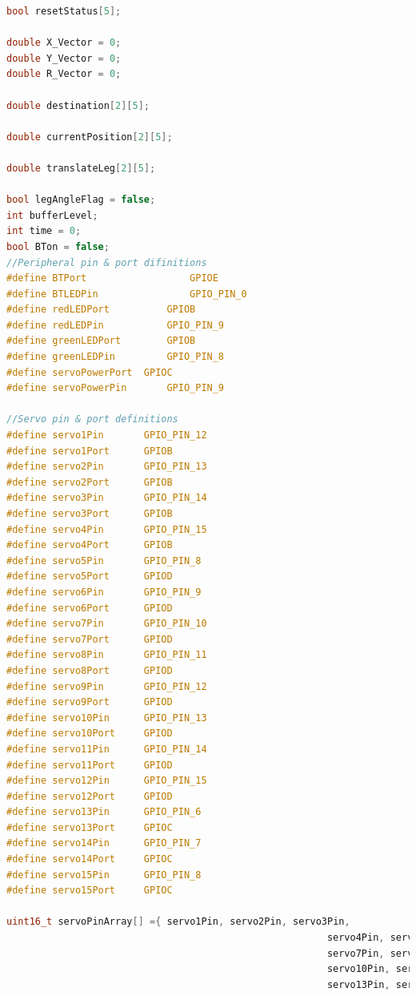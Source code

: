 \begin{lstlisting}[language = c]
bool resetStatus[5];																		//Array used to store reset status of each leg

double X_Vector = 0;																		//Global movement vectors
double Y_Vector = 0;
double R_Vector = 0;	

double destination[2][5];																//2D array that stores X([0]) and Y([1]) values 
																												//for the destination of each foot
double currentPosition[2][5];														//2D array that stores X and Y values for the 
																												//current position of each foot
double translateLeg[2][5];															//Stores coordinates of joint 1 for each leg.
																												//Replaces TranslateLeg()
bool legAngleFlag = false;															//True when busy writing to legAngles
int bufferLevel;																				//Used to select between levels in buffer
int time = 0;																						//Keeps timing of robot movement for speed calculations
bool BTon = false;																			//Used in program to determine if Bluetooth is connected or not.
//Peripheral pin & port difinitions
#define BTPort 					GPIOE
#define BTLEDPin 				GPIO_PIN_0
#define redLEDPort 			GPIOB
#define redLEDPin 			GPIO_PIN_9
#define greenLEDPort 		GPIOB
#define greenLEDPin 		GPIO_PIN_8
#define servoPowerPort	GPIOC
#define servoPowerPin		GPIO_PIN_9

//Servo pin & port definitions
#define servo1Pin 		GPIO_PIN_12
#define servo1Port 		GPIOB
#define servo2Pin 		GPIO_PIN_13
#define servo2Port 		GPIOB
#define servo3Pin 		GPIO_PIN_14
#define servo3Port 		GPIOB
#define servo4Pin 		GPIO_PIN_15
#define servo4Port 		GPIOB
#define servo5Pin 		GPIO_PIN_8
#define servo5Port 		GPIOD
#define servo6Pin 		GPIO_PIN_9
#define servo6Port 		GPIOD
#define servo7Pin 		GPIO_PIN_10
#define servo7Port 		GPIOD
#define servo8Pin 		GPIO_PIN_11
#define servo8Port 		GPIOD
#define servo9Pin 		GPIO_PIN_12
#define servo9Port 		GPIOD
#define servo10Pin 		GPIO_PIN_13
#define servo10Port 	GPIOD
#define servo11Pin 		GPIO_PIN_14
#define servo11Port 	GPIOD
#define servo12Pin 		GPIO_PIN_15
#define servo12Port 	GPIOD
#define servo13Pin 		GPIO_PIN_6
#define servo13Port 	GPIOC
#define servo14Pin 		GPIO_PIN_7
#define servo14Port 	GPIOC
#define servo15Pin 		GPIO_PIN_8
#define servo15Port 	GPIOC

uint16_t servoPinArray[] ={	servo1Pin, servo2Pin, servo3Pin,
														servo4Pin, servo5Pin, servo6Pin,
														servo7Pin, servo8Pin, servo9Pin,
														servo10Pin, servo11Pin, servo12Pin,
														servo13Pin, servo14Pin, servo15Pin};


\end{lstlisting}
